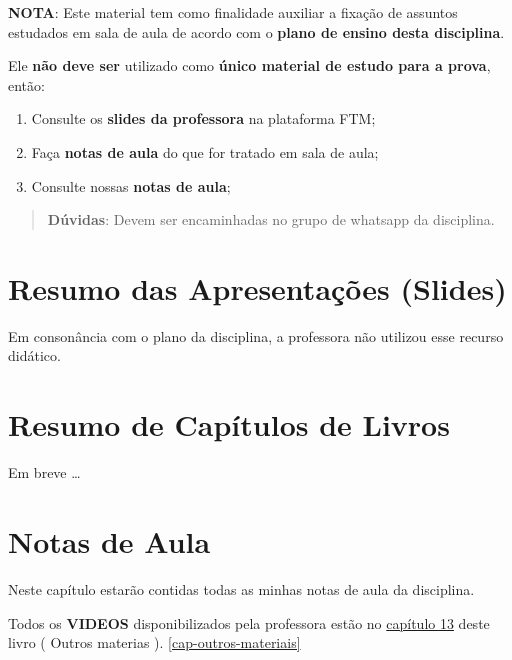 \documentclass[
]{book}
\providecommand{\tightlist}{%
  \setlength{\itemsep}{0pt}\setlength{\parskip}{0pt}}
\begin{document}
\textbf{NOTA}: Este material tem como finalidade auxiliar a fixação de assuntos estudados em sala de aula de acordo com o \textbf{plano de ensino desta disciplina}.

Ele \textbf{não deve ser} utilizado como \textbf{único material de estudo para a prova}, então:

\begin{enumerate}
\def\labelenumi{\arabic{enumi}.}
\tightlist
\item
  Consulte os \textbf{slides da professora} na plataforma FTM;\\
\item
  Faça \textbf{notas de aula} do que for tratado em sala de aula;\\
\item
  Consulte nossas \textbf{notas de aula};
\end{enumerate}

\begin{quote}
\textbf{Dúvidas}: Devem ser encaminhadas no grupo de whatsapp da disciplina.
\end{quote}

\hypertarget{resumo-das-apresentauxe7uxf5es-slides}{%
\chapter{Resumo das Apresentações (Slides)}\label{resumo-das-apresentauxe7uxf5es-slides}}

Em consonância com o plano da disciplina, a professora não utilizou esse recurso didático.

\hypertarget{resumo-de-capuxedtulos-de-livros}{%
\chapter{Resumo de Capítulos de Livros}\label{resumo-de-capuxedtulos-de-livros}}

Em breve \ldots{}

\hypertarget{notas-de-aula}{%
\chapter{Notas de Aula}\label{notas-de-aula}}

Neste capítulo estarão contidas todas as minhas notas de aula da disciplina.

Todos os \textbf{VIDEOS} disponibilizados pela professora estão no \protect\hyperlink{cap-outros-materiais}{capítulo 13} deste livro ( Outros materias ). \ref{cap-outros-materiais}
\end{document}
